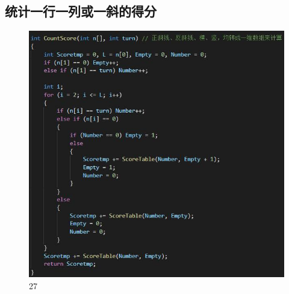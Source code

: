 \documentclass[UTF8]{ctexart}
\begin{document}
\subsection{统计一行一列或一斜的得分}
\begin{figure}[H]
    \centering
    \includegraphics[scale=1.0]{26.jpg}
\caption{27}
\end{figure}
\end{document}
